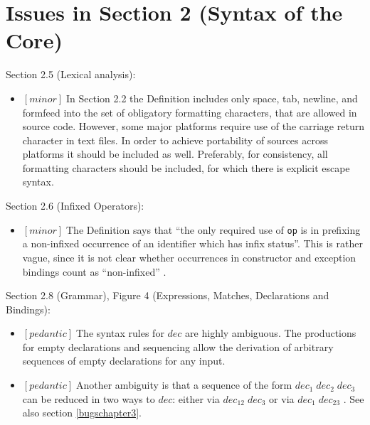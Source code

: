 \documentclass{article}
\newcommand{\m}[1]{$[\mathit{#1}]\;$}
\newcommand{\minor}{\m{minor}}
\newcommand{\pedantic}{\m{pedantic}}
\begin{document}
\section{Issues in Section 2 (Syntax of the Core)}
\label{bugschapter2}




Section 2.5 (Lexical analysis):
\nopagebreak

\begin{itemize}
\item \minor In Section 2.2 the Definition includes only space, tab, newline, and formfeed into the set of obligatory formatting characters, that are allowed in source code. However, some major platforms require use of the carriage return character in text files. In order to achieve portability of sources across platforms it should be included as well. Preferably, for consistency, all formatting characters should be included, for which there is explicit escape syntax.
\end{itemize}


Section 2.6 (Infixed Operators):
\nopagebreak

\begin{itemize}
\item \minor The Definition says that ``the only required use of {\tt op} is in prefixing a non-infixed occurrence of an identifier which has infix status''. This is rather vague, since it is not clear whether occurrences in constructor and exception bindings count as ``non-infixed'' \cite{mistakes}.
\end{itemize}


Section 2.8 (Grammar), Figure 4 (Expressions, Matches, Declarations and Bindings):
\nopagebreak

\begin{itemize}
\item \pedantic The syntax rules for $\mathit{dec}$ are highly ambiguous. The productions for empty declarations and sequencing allow the derivation of arbitrary sequences of empty declarations for any input.

\item \pedantic Another ambiguity is that a sequence of the form $\mathit{dec}_1\;\mathit{dec}_2\;\mathit{dec}_3$ can be reduced in two ways to $\mathit{dec}$: either via $\mathit{dec}_{12}\;\mathit{dec}_3$ or via $\mathit{dec}_1\;\mathit{dec}_{23}$ \cite{mistakes}. See also section \ref{bugschapter3}.
\end{itemize}
\end{document}
